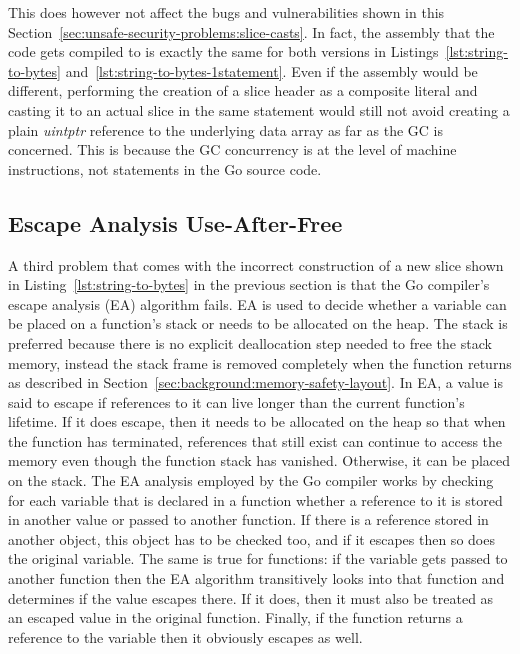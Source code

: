 

This does however not affect the bugs and vulnerabilities shown in this
Section~\ref{sec:unsafe-security-problems:slice-casts}.
In fact, the assembly that the code gets compiled to is exactly the same for both versions in
Listings~\ref{lst:string-to-bytes} and~\ref{lst:string-to-bytes-1statement}.
Even if the assembly would be different, performing the creation of a slice header as a composite literal and casting it
to an actual slice in the same statement would still not avoid creating a plain \textit{uintptr} reference to the
underlying data array as far as the \acrshort{GC} is concerned.
This is because the \acrshort{GC} concurrency is at the level of machine instructions, not statements in the Go source
code.



\subsection{Escape Analysis Use-After-Free}\label{subsec:unsafe-security-problems:slice-casts:escape-analysis}

A third problem that comes with the incorrect construction of a new slice shown in Listing~\ref{lst:string-to-bytes} in
the previous section is that the Go compiler's escape analysis (\acrshort{EA}) algorithm fails.
\acrshort{EA} is used to decide whether a variable can be placed on a function's stack or needs to be allocated on the
heap.
The stack is preferred because there is no explicit deallocation step needed to free the stack memory, instead the stack
frame is removed completely when the function returns as described in Section~\ref{sec:background:memory-safety-layout}.
In \acrshort{EA}, a value is said to escape if references to it can live longer than the current function's lifetime.
If it does escape, then it needs to be allocated on the heap so that when the function has terminated, references that
still exist can continue to access the memory even though the function stack has vanished.
Otherwise, it can be placed on the stack.
The \acrshort{EA} analysis employed by the Go compiler works by checking for each variable that is declared in a
function whether a reference to it is stored in another value or passed to another function.
If there is a reference stored in another object, this object has to be checked too, and if it escapes then so does the
original variable.
The same is true for functions: if the variable gets passed to another function then the \acrshort{EA} algorithm
transitively looks into that function and determines if the value escapes there.
If it does, then it must also be treated as an escaped value in the original function.
Finally, if the function returns a reference to the variable then it obviously escapes as well.

